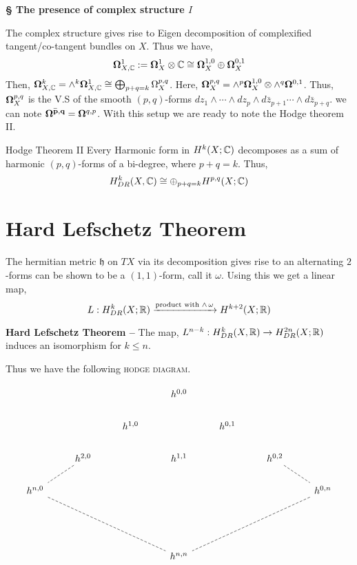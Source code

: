 \documentclass[11pt]{article}
\begin{document}
\vspace*{0.2cm}

\noindent \textbf{\textcolor{darkcerulean}{\S}  The presence of complex structure $I$}

\vspace*{0.2cm}

\noindent The complex structure gives rise to  Eigen decomposition of complexified tangent/co-tangent bundles on $X$. Thus we have, 
$$\mathbf{\Omega}^{1}_{X,\mathbb{C}}:= \mathbf{\Omega}^1_{X}\otimes \mathbb{C} \cong \mathbf{\Omega}_X^{1,0} \oplus \mathbf{\Omega}_X^{0,1}$$
Then, $\mathbf{\Omega}_{X,\mathbb{C}}^k= \wedge^k \mathbf{\Omega}^1_{X,\mathbb{C}}\cong \bigoplus_{p+q=k}\Omega^{p,q}_{X}$. Here, $\mathbf{\Omega}_{X}^{p,q} = \wedge^p \mathbf{\Omega}^{1,0}_X \otimes \wedge^q \mathbf{\Omega}^{0,1}$. Thus, $\mathbf{\Omega}_X^{p,q}$ is the V.S of the smooth $(p,q)$-forms $dz_1\wedge\cdots \wedge dz_p \wedge d\bar{z}_{p+1} \cdots \wedge d\bar{z}_{p+q}$. we can note $\bar{\mathbf{\Omega}^{p,q}} = \mathbf{\Omega}^{q,p}$. With this setup we are ready to note the Hodge theorem II. 

\begin{Thm}{Hodge Theorem II}{}
    \hspace*{0.1cm} Every Harmonic form in $H^k(X;\mathbb{C})$ decomposes as a sum of harmonic $(p,q)$-forms of a bi-degree, where $p+q=k$. Thus, \[H^k_{DR}(X,\mathbb{C})\cong \oplus_{p+q=k} H^{p,q}(X;\mathbb{C})\]
\end{Thm}


\section{Hard Lefschetz Theorem}

The hermitian metric $\mathfrak{h}$ on $TX$ via its decomposition gives rise to an alternating $2$-forms can be shown to be a $(1,1)$-form, call it $\omega$. Using this we get a linear map,
 $$L: H^{k}_{DR}(X;\mathbb{R})\xrightarrow{\text{product with }\wedge \, \omega} H^{k+2}(X;\mathbb{R})$$

\noindent \textcolor{darkcerulean}{\textbf{Hard Lefschetz Theorem --}} The map, $L^{n-k}:H^k_{DR}(X,\mathbb{R})\to H^{2n}_{DR}(X;\mathbb{R})$ induces an isomorphism for $k \leq n$. 


\pagebreak

Thus we have the following \textsc{hodge diagram}.

\[\begin{tikzcd}
	&&& {h^{0,0}} \\
	&& {h^{1,0}} && {h^{0,1}} \\
	& {h^{2,0}} && {h^{1,1}} && {h^{0,2}} \\
	{h^{n,0}} &&&&&& {h^{0,n}} \\
	\\
	\\
	&&& {h^{n,n}}
	\arrow[dashed, no head, from=3-2, to=4-1]
	\arrow[dashed, no head, from=3-6, to=4-7]
	\arrow[dashed, no head, from=4-1, to=7-4]
	\arrow[dashed, no head, from=4-7, to=7-4]
\end{tikzcd}\]
\end{document}
